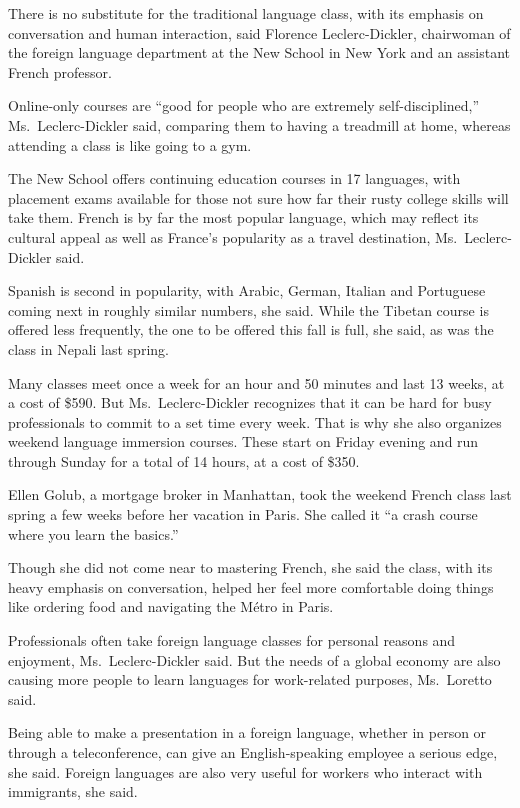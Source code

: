 ﻿\documentclass[12pt]{article}
\begin{document}
There is no substitute for the traditional language class, with its emphasis on conversation and
human interaction, said Florence Leclerc-Dickler, chairwoman of the foreign language department at
the New School in New York and an assistant French professor.

Online-only courses are ``good for people who are extremely self-disciplined,'' Ms.~Leclerc-Dickler
said, comparing them to having a treadmill at home, whereas attending a class is like going to a
gym.

The New School offers continuing education courses in 17 languages, with placement exams available
for those not sure how far their rusty college skills will take them. French is by far the most
popular language, which may reflect its cultural appeal as well as France's popularity as a travel
destination, Ms.~Leclerc-Dickler said.

Spanish is second in popularity, with Arabic, German, Italian and Portuguese coming next in roughly
similar numbers, she said. While the Tibetan course is offered less frequently, the one to be
offered this fall is full, she said, as was the class in Nepali last spring.

Many classes meet once a week for an hour and 50 minutes and last 13 weeks, at a cost of \$590. But
Ms.~Leclerc-Dickler recognizes that it can be hard for busy professionals to commit to a set time
every week. That is why she also organizes weekend language immersion courses. These start on Friday
evening and run through Sunday for a total of 14 hours, at a cost of \$350.

Ellen Golub, a mortgage broker in Manhattan, took the weekend French class last spring a few weeks
before her vacation in Paris. She called it ``a crash course where you learn the basics.''

Though she did not come near to mastering French, she said the class, with its heavy emphasis on
conversation, helped her feel more comfortable doing things like ordering food and navigating the
M\'etro in Paris.

Professionals often take foreign language classes for personal reasons and enjoyment,
Ms.~Leclerc-Dickler said. But the needs of a global economy are also causing more people to learn
languages for work-related purposes, Ms.~Loretto said.

Being able to make a presentation in a foreign language, whether in person or through a
teleconference, can give an English-speaking employee a serious edge, she said. Foreign languages
are also very useful for workers who interact with immigrants, she said.
\end{document}
